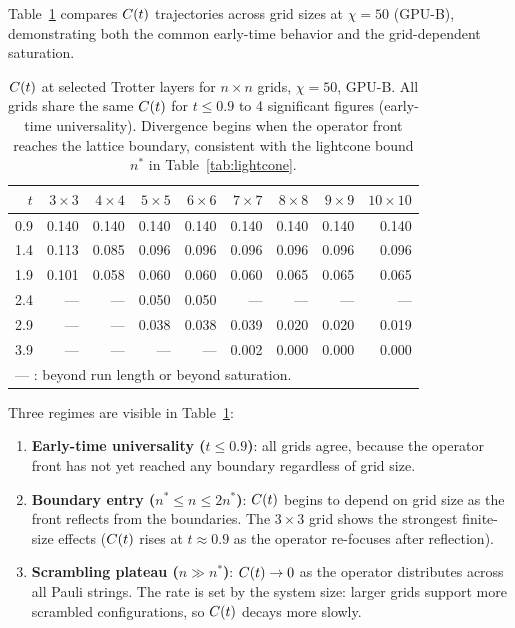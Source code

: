 Table~\ref{tab:ct_grids} compares $C(t)$ trajectories across grid sizes at
$\chi=50$ (GPU-B), demonstrating both the common early-time behavior and
the grid-dependent saturation.

\begin{table}[ht]
\centering
\caption{$C(t)$ at selected Trotter layers for $n\times n$ grids, $\chi=50$, GPU-B.
 All grids share the same $C(t)$ for $t \leq 0.9$ to 4 significant figures
 (early-time universality).
 Divergence begins when the operator front reaches the lattice boundary,
 consistent with the lightcone bound $n^*$ in Table~\ref{tab:lightcone}.
}
\label{tab:ct_grids}
\begin{tabular}{r rrrrrrrr}
\toprule
$t$ & $3\times3$ & $4\times4$ & $5\times5$ & $6\times6$ & $7\times7$ & $8\times8$ & $9\times9$ & $10\times10$ \\
\midrule
0.9 & 0.140 & 0.140 & 0.140 & 0.140 & 0.140 & 0.140 & 0.140 & 0.140 \\
1.4 & 0.113 & 0.085 & 0.096 & 0.096 & 0.096 & 0.096 & 0.096 & 0.096 \\
1.9 & 0.101 & 0.058 & 0.060 & 0.060 & 0.060 & 0.065 & 0.065 & 0.065 \\
2.4 & --- & --- & 0.050 & 0.050 & --- & --- & --- & --- \\
2.9 & --- & --- & 0.038 & 0.038 & 0.039 & 0.020 & 0.020 & 0.019 \\
3.9 & --- & --- & --- & --- & 0.002 & 0.000 & 0.000 & 0.000 \\
\midrule
\multicolumn{9}{l}{--- : beyond run length or beyond saturation.}\\
\bottomrule
\end{tabular}
\end{table}

Three regimes are visible in Table~\ref{tab:ct_grids}:
\begin{enumerate}
 \item \textbf{Early-time universality ($t \leq 0.9$)}: all grids agree, because
 the operator front has not yet reached any boundary regardless of grid size.
 \item \textbf{Boundary entry ($n^* \leq n \leq 2n^*$)}: $C(t)$ begins to depend
 on grid size as the front reflects from the boundaries.
 The $3\times3$ grid shows the strongest finite-size effects ($C(t)$ rises
 at $t \approx 0.9$ as the operator re-focuses after reflection).
 \item \textbf{Scrambling plateau ($n \gg n^*$)}: $C(t) \to 0$ as the operator
 distributes across all Pauli strings.
 The rate is set by the system size: larger grids support more scrambled
 configurations, so $C(t)$ decays more slowly.
\end{enumerate}

